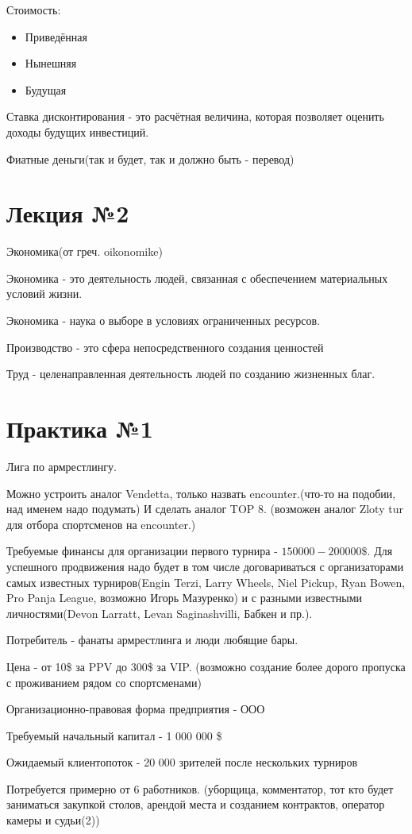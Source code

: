 \documentclass[a4paper, 12pt]{article}
\begin{document}
	Стоимость:
	\begin{itemize}
		\item Приведённая
		\item Нынешняя
		\item Будущая
	\end{itemize}

	Ставка дисконтирования - это расчётная величина, которая позволяет оценить доходы будущих инвестиций.
	
	Фиатные деньги(так и будет, так и должно быть - перевод)

	\part*{Лекция №2}
	
	Экономика(от греч. oikonomike)
	
	Экономика - это деятельность людей, связанная с обеспечением материальных условий жизни.
	
	Экономика - наука о выборе в условиях ограниченных ресурсов.
	
	Производство - это сфера непосредственного создания ценностей
	
	Труд - целенаправленная деятельность людей по созданию жизненных благ.
	
	
	
	\part*{Практика №1}
	
	Лига по армрестлингу. 
	
	Можно устроить аналог Vendetta, только назвать encounter.(что-то на подобии, над именем надо подумать) И сделать аналог TOP 8. (возможен аналог Zloty tur для отбора спортсменов на encounter.)
	
	Требуемые финансы для организации первого турнира - $150 000 - 200 000 \$$. Для успешного продвижения надо будет в том числе договариваться с организаторами самых известных турниров(Engin Terzi, Larry Wheels, Niel Pickup, Ryan Bowen, Pro Panja League, возможно Игорь Мазуренко) и с разными известными личностями(Devon Larratt, Levan Saginashvilli, Бабкен и пр.). 
	
	Потребитель - фанаты армрестлинга и люди любящие бары.
	
	Цена - от 10\$ за PPV до 300\$ за VIP. (возможно создание более дорого пропуска с проживанием рядом со спортсменами)
	
	Организационно-правовая форма предприятия - ООО
	
	Требуемый начальный капитал - 1 000 000 \$
	
	Ожидаемый клиентопоток - 20 000 зрителей после нескольких турниров
	
	Потребуется примерно от 6 работников. (уборщица, комментатор, тот кто будет заниматься закупкой столов, арендой места и созданием контрактов, оператор камеры и судьи(2))
\end{document}
